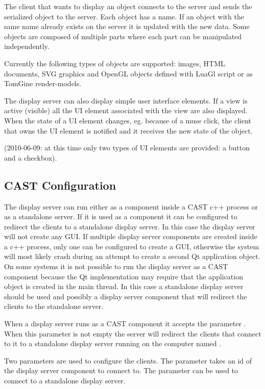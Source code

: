 The client that wants to display an object connects to the server and sends the
serialized object to the server. Each object has a name. If an object with the
same name already exists on the server it is updated with the new data. Some
objects are composed of multiple parts where each part can be manipulated
independently.

Currently the following types of objects are supported: images, HTML documents,
SVG graphics and OpenGL objects defined with LuaGl script or as TomGine
render-models. 

The display server can also display simple user interface elements. If a view
is active (visible) all the UI element associated with the view are also
displayed. When the state of a UI element changes, eg.  because of a muse
click, the client that owns the UI element is notified and it receives the new
state of the object.

(2010-06-09: at this time only two types of UI elements are provided: a button
and a checkbox).

\subsection{CAST Configuration}

The display server can run either as a component inside a CAST c++ process or
as a standalone server. If it is used as a component it can be configured to
redirect the clients to a standalone display server. In this case the display
server will not create any GUI. If multiple display server components are
created inside a c++ process, only one can be configured to create a GUI,
otherwise the system will most likely crash during an attempt to create a
second Qt application object. On some systems it is not possible to run the
display server as a CAST component because the Qt implementation may require
that the application object is created in the main thread. In this case a
standalone display server should be used and possibly a display server
component that will redirect the clients to the standalone server.

When a display server runs as a CAST component it accepts the parameter
. When this parameter is not empty the
server will redirect the clients that connect to it to a standalone display
server running on the computer named .

Two parameters are used to configure the clients. The parameter
 takes an id of the display server component to
connect to. The parameter  can
be used to connect to a standalone display server.

